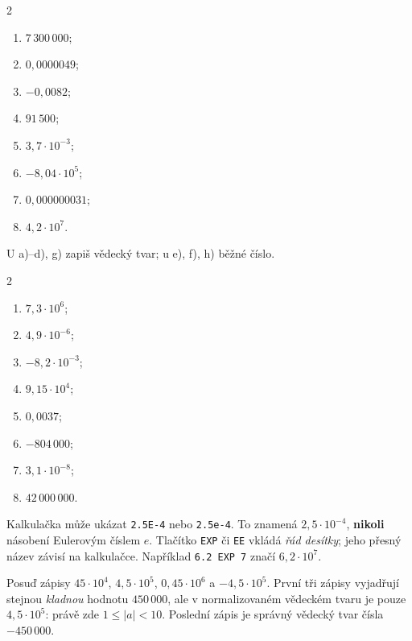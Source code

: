 \documentclass[11pt,a4paper]{article}
\begin{document}
\begin{zadaniReseniBox}[breakable=false,title={Samostatná práce 1: tam a zpět}]
\begin{multicols}{2}
\begin{enumerate}[label=\alph*)]
\item $7\,300\,000$;
\item $0{,}0000049$;
\item $-0{,}0082$;
\item $91\,500$;
\item $3{,}7\cdot10^{-3}$;
\item $-8{,}04\cdot10^5$;
\item $0{,}000000031$;
\item $4{,}2\cdot10^7$.
\end{enumerate}
\end{multicols}
U a)--d), g) zapiš vědecký tvar; u e), f), h) běžné číslo.
\tcblower
\begin{multicols}{2}
\begin{enumerate}[label=\alph*)]
\item $7{,}3\cdot10^6$;
\item $4{,}9\cdot10^{-6}$;
\item $-8{,}2\cdot10^{-3}$;
\item $9{,}15\cdot10^4$;
\item $0{,}0037$;
\item $-804\,000$;
\item $3{,}1\cdot10^{-8}$;
\item $42\,000\,000$.
\end{enumerate}
\end{multicols}
\end{zadaniReseniBox}

Kalkulačka může ukázat \texttt{2.5E-4} nebo \texttt{2.5e-4}.
To znamená $2{,}5\cdot10^{-4}$, \textbf{nikoli} násobení Eulerovým číslem $e$.
Tlačítko \texttt{EXP} či \texttt{EE} vkládá \emph{řád desítky}; jeho přesný název
závisí na kalkulačce. Například \texttt{6.2 EXP 7} značí $6{,}2\cdot10^7$.

\begin{prikladReseniBox}[breakable=false,title={Příklad 2: co je a není správně normalizované?}]
Posuď zápisy $45\cdot10^4$, $4{,}5\cdot10^5$,
$0{,}45\cdot10^6$ a $-4{,}5\cdot10^5$.
\tcblower
První tři zápisy vyjadřují stejnou \emph{kladnou} hodnotu
$450\,000$, ale v normalizovaném vědeckém tvaru je pouze
$\boxed{4{,}5\cdot10^5}$: právě zde $1\le|a|<10$.
Poslední zápis je správný vědecký tvar čísla $-450\,000$.
\end{prikladReseniBox}
\end{document}
